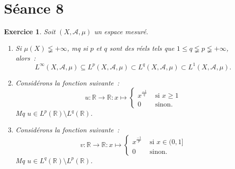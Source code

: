\documentclass{article}
\newtheorem{ex}{Exercice}[section]
\theoremstyle{definition}
\newcommand{\pinfty}{{+\infty}}
\newcommand{\R}{{\mathbb R}}
\begin{document}
\section{Séance 8}
\begin{ex} Soit $(X, \mathcal A, \mu)$ un espace mesuré.
\begin{enumerate}
	\item Si $\mu(X) \lneqq \pinfty$, mq si $p$ et $q$ sont des réels tels que $1 \leq q \lneqq p \lneqq \pinfty$, alors~:
	\[L^\infty(X, \mathcal A, \mu) \subseteq L^p(X, \mathcal A, \mu) \subset L^q(X, \mathcal A, \mu) \subset L^1(X, \mathcal A, \mu).\]
	\item Considérons la fonction suivante~:
	\[u : \R \to \R : x \mapsto \begin{cases}x^{\frac {-1}q} &\text{ si } x \geq 1 \\0 &\text{ sinon}.\end{cases}\]
	Mq $u \in L^p(\R) \setminus L^q(\R)$.
	\item Considérons la fonction suivante~:
	\[v : \R \to \R : x \mapsto \begin{cases}x^{\frac {-1}p} &\text{ si } x \in (0, 1] \\0 &\text{ sinon}.\end{cases}\]
	Mq $u \in L^q(\R) \setminus L^p(\R)$.
\end{enumerate}
\end{ex}
\end{document}
